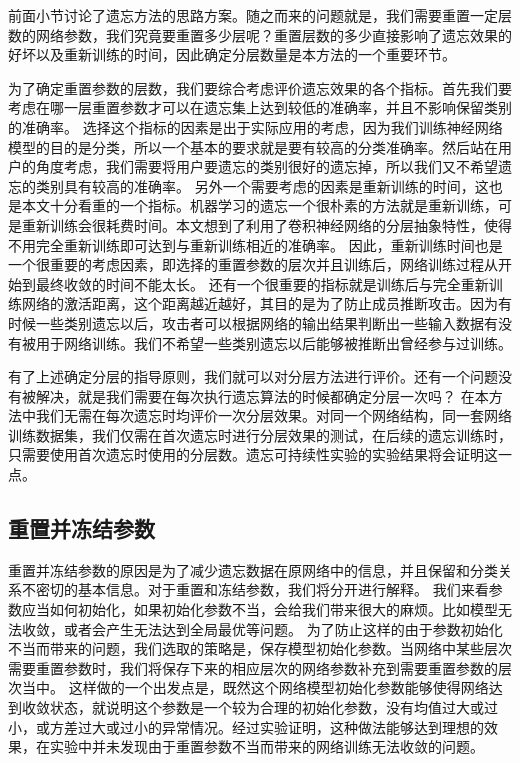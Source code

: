 前面小节讨论了遗忘方法的思路方案。随之而来的问题就是，我们需要重置一定层数的网络参数，我们究竟要重置多少层呢？重置层数的多少直接影响了遗忘效果的好坏以及重新训练的时间，因此确定分层数量是本方法的一个重要环节。

为了确定重置参数的层数，我们要综合考虑评价遗忘效果的各个指标。首先我们要考虑在哪一层重置参数才可以在遗忘集上达到较低的准确率，并且不影响保留类别的准确率。
选择这个指标的因素是出于实际应用的考虑，因为我们训练神经网络模型的目的是分类，所以一个基本的要求就是要有较高的分类准确率。然后站在用户的角度考虑，我们需要将用户要遗忘的类别很好的遗忘掉，所以我们又不希望遗忘的类别具有较高的准确率。
另外一个需要考虑的因素是重新训练的时间，这也是本文十分看重的一个指标。机器学习的遗忘一个很朴素的方法就是重新训练，可是重新训练会很耗费时间。本文想到了利用了卷积神经网络的分层抽象特性，使得不用完全重新训练即可达到与重新训练相近的准确率。
因此，重新训练时间也是一个很重要的考虑因素，即选择的重置参数的层次并且训练后，网络训练过程从开始到最终收敛的时间不能太长。
还有一个很重要的指标就是训练后与完全重新训练网络的激活距离，这个距离越近越好，其目的是为了防止成员推断攻击。因为有时候一些类别遗忘以后，攻击者可以根据网络的输出结果判断出一些输入数据有没有被用于网络训练。我们不希望一些类别遗忘以后能够被推断出曾经参与过训练。

有了上述确定分层的指导原则，我们就可以对分层方法进行评价。还有一个问题没有被解决，就是我们需要在每次执行遗忘算法的时候都确定分层一次吗？
在本方法中我们无需在每次遗忘时均评价一次分层效果。对同一个网络结构，同一套网络训练数据集，我们仅需在首次遗忘时进行分层效果的测试，在后续的遗忘训练时，只需要使用首次遗忘时使用的分层数。遗忘可持续性实验的实验结果将会证明这一点。

\subsection{重置并冻结参数}

重置并冻结参数的原因是为了减少遗忘数据在原网络中的信息，并且保留和分类关系不密切的基本信息。对于重置和冻结参数，我们将分开进行解释。
我们来看参数应当如何初始化，如果初始化参数不当，会给我们带来很大的麻烦。比如模型无法收敛，或者会产生无法达到全局最优等问题。
为了防止这样的由于参数初始化不当而带来的问题，我们选取的策略是，保存模型初始化参数。当网络中某些层次需要重置参数时，我们将保存下来的相应层次的网络参数补充到需要重置参数的层次当中。
这样做的一个出发点是，既然这个网络模型初始化参数能够使得网络达到收敛状态，就说明这个参数是一个较为合理的初始化参数，没有均值过大或过小，或方差过大或过小的异常情况。经过实验证明，这种做法能够达到理想的效果，在实验中并未发现由于重置参数不当而带来的网络训练无法收敛的问题。

